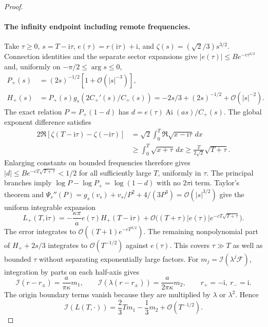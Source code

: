 \documentclass[11pt]{article}
\theoremstyle{remark}\newtheorem{remark}[theorem]{Remark}
\newcommand{\OO}{\mathcal O}
\newcommand{\Ai}{\operatorname{Ai}}
\newcommand{\ii}{\mathrm i}
\newcommand{\FF}{\mathcal F}
\newcommand{\inv}{\mathcal I}
\begin{document}
\begin{proof}
\paragraph{The infinity endpoint including remote frequencies.}
Take $\tau\ge0$, $s=T-\ii\tau$, $e(\tau)=r(\ii\tau)+\ii$,
and $\zeta(s)=(\sqrt2/3)s^{3/2}$. Connection identities and the separate
sector expansions give $|e(\tau)|\le Be^{-c\tau^{3/2}}$ and, uniformly
on $-\pi/2\le\arg s\le0$,
\[
\begin{aligned}
 P_+(s)&=(2s)^{-1/2}[1+\OO(|s|^{-3})],\\
 H_+(s)&=P_+(s)g_s(2C_+'(s)/C_+(s))
       =-2s/3+(2s)^{-1/2}+\OO(|s|^{-2}).
\end{aligned}
\]
The exact relation $P=P_+(1-d)$ has
$d=e(\tau)\Ai(as)/C_+(s)$.
The global exponent difference satisfies
\[
 \begin{aligned}
 2\Re[\zeta(T-\ii\tau)-\zeta(-\ii\tau)]
 &=\sqrt2\int_0^T\Re\sqrt{x-\ii\tau}\,dx\\
 &\ge\int_0^T\sqrt{x+\tau}\,dx
 \ge\frac{T}{2\sqrt2}\sqrt{T+\tau}.
 \end{aligned}
\]
Enlarging constants on bounded frequencies therefore gives
$|d|\le Be^{-cT\sqrt{T+\tau}}<1/2$ for all sufficiently large $T$,
uniformly in $\tau$. The principal branches imply
$\log P-\log P_+=\log(1-d)$ with no $2\pi\ii$ term.
Taylor's theorem and
$\Psi_s''(P)=g_s(v_s)+v_s/P^2+4/(3P^3)=\OO(|s|^{3/2})$
give the uniform integrable expansion
\begin{equation}\label{xtw:frac:eq:infinityL}
 L_+(T,\ii\tau)=-\frac{\kappa\pi}{a}e(\tau)H_+(T-\ii\tau)
 +\OO\bigl((T+\tau)|e(\tau)|e^{-cT\sqrt{T+\tau}}\bigr).
\end{equation}
The error integrates to $\OO((T+1)e^{-cT^{3/2}})$.
The remaining nonpolynomial part of $H_++2s/3$ integrates to
$\OO(T^{-1/2})$ against $e(\tau)$. This covers $\tau\gg T$ as well as
bounded $\tau$ without separating exponentially large factors.
For $m_j=\inv(\lambda^j\FF)$, integration by parts on each half-axis gives
\[
 \inv(r-r_\pm)=\frac a{\pi\kappa}m_1,\qquad
 \inv(\lambda(r-r_\pm))=\frac a{2\pi\kappa}m_2,
 \qquad r_+=-\ii,\ r_-=\ii.
\]
The origin boundary terms vanish because they are multiplied by $\lambda$
or $\lambda^2$. Hence
\begin{equation}\label{xtw:frac:eq:infinitylimit}
 \inv(L(T,\cdot))=\frac23Tm_1-\frac13m_2+\OO(T^{-1/2}).
\end{equation}


\end{proof}
\end{document}
